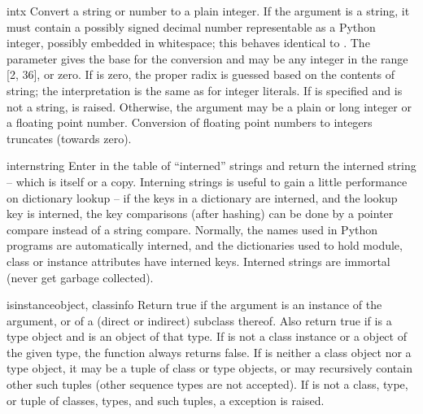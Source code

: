 \begin{funcdesc}{int}{x}
  Convert a string or number to a plain integer.  If the argument is a
  string, it must contain a possibly signed decimal number
  representable as a Python integer, possibly embedded in whitespace;
  this behaves identical to .  The  parameter gives the base for the
  conversion and may be any integer in the range [2, 36], or zero.  If
   is zero, the proper radix is guessed based on the
  contents of string; the interpretation is the same as for integer
  literals.  If  is specified and  is not a string,
   is raised.
  Otherwise, the argument may be a plain or
  long integer or a floating point number.  Conversion of floating
  point numbers to integers truncates (towards zero).
\end{funcdesc}

\begin{funcdesc}{intern}{string}
  Enter  in the table of ``interned'' strings and return
  the interned string -- which is  itself or a copy.
  Interning strings is useful to gain a little performance on
  dictionary lookup -- if the keys in a dictionary are interned, and
  the lookup key is interned, the key comparisons (after hashing) can
  be done by a pointer compare instead of a string compare.  Normally,
  the names used in Python programs are automatically interned, and
  the dictionaries used to hold module, class or instance attributes
  have interned keys.  Interned strings are immortal (never get
  garbage collected).
\end{funcdesc}

\begin{funcdesc}{isinstance}{object, classinfo}
  Return true if the  argument is an instance of the
   argument, or of a (direct or indirect) subclass
  thereof.  Also return true if  is a type object and
   is an object of that type.  If  is not a
  class instance or a object of the given type, the function always
  returns false.  If  is neither a class object nor a
  type object, it may be a tuple of class or type objects, or may
  recursively contain other such tuples (other sequence types are not
  accepted).  If  is not a class, type, or tuple of
  classes, types, and such tuples, a  exception
  is raised.
\end{funcdesc}

